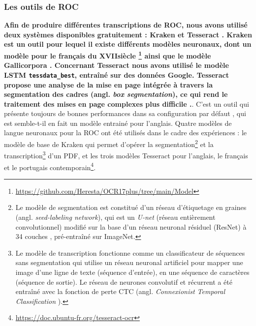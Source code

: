 \subsubsection{Les outils de ROC}
\textbf{Afin de produire différentes transcriptions de ROC, nous avons utilisé deux systèmes disponibles gratuitement : Kraken \cite{kiessling2019kraken} et Tesseract \cite{smith2007overview}. Kraken est un outil pour lequel il existe différents modèles neuronaux,
dont un modèle pour le français du XVII\ieme{}siècle \cite{gabay:hal-02577236}\footnote{\url{https://github.com/Heresta/OCR17plus/tree/main/Model}} 
ainsi que le modèle Gallicorpora \cite{pinche_2022_7410529}. Concernant Tesseract nous avons utilisé le modèle LSTM \texttt{tessdata\_best}, entraîné sur des données Google. Tesseract propose une analyse de la mise en page intégrée à travers la segmentation des cadres (angl. \textit{box segmentation}), ce qui rend le traitement des mises en page complexes plus difficile \cite{reul2017case}.}. C'est un outil qui présente toujours de bonnes performances dans sa configuration par défaut \cite{clausner2020efficient}, qui est semble-t-il en fait un modèle entrainé pour l'anglais. Quatre modèles de langue neuronaux pour la ROC ont été utilisés dans le cadre des expériences : le modèle de base de Kraken qui permet d'opérer la segmentation\footnote{Le modèle de segmentation est constitué d'un réseau d'étiquetage en graines (angl. \textit{seed-labeling network}), qui est un \textit{U-net} (\og{}réseau entièrement convolutionnel\fg{}) modifié \cite{ronneberger2015} sur la base d'un réseau neuronal résiduel (ResNet) à 34 couches \cite{he2016}, pré-entraîné sur ImageNet.} et la transcription\footnote{Le modèle de transcription fonctionne comme un classificateur de séquences sans segmentation qui utilise un réseau neuronal artificiel pour mapper une image d'une ligne de texte (séquence d'entrée), en une séquence de caractères (séquence de sortie). Le réseau de neurones convolutif et récurrent a été entraîné avec la fonction de perte CTC (angl. \textit{Connexionist Temporal Classification} \cite{graves2006connectionist}).} d'un PDF, et
les trois modèles Tesseract pour l'anglais, le français et le portugais contemporain\footnote{\url{https://doc.ubuntu-fr.org/tesseract-ocr}}.

